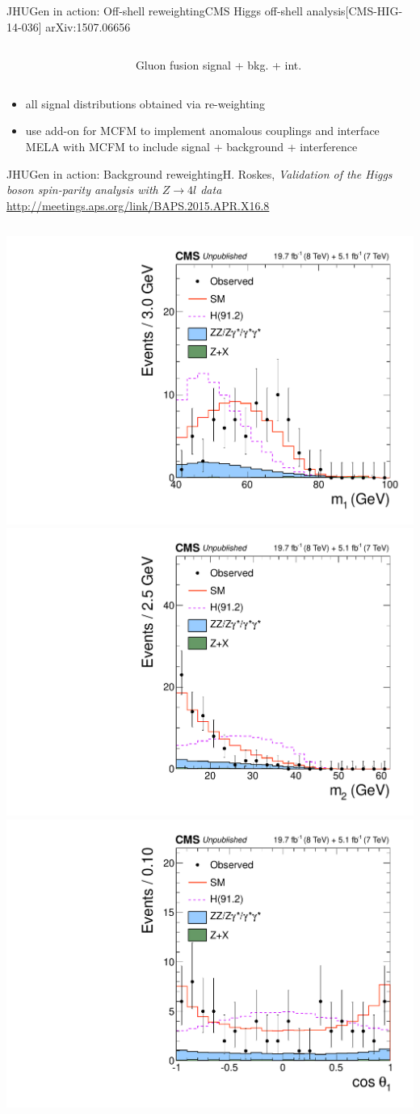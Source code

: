 \documentclass[usenames,dvipsnames,svgnames,table]{beamer}
\begin{document}
\begin{frame}{JHUGen in action: Off-shell reweighting}{CMS Higgs off-shell analysis\hfill [CMS-HIG-14-036] arXiv:1507.06656}
\begin{columns}
\begin{column}{0.75\textwidth}
\end{column}
\begin{column}{0.15\textwidth}
Gluon fusion signal + bkg. + int.
\end{column}
\end{columns}
\begin{itemize} \footnotesize
\item all signal distributions obtained via re-weighting
\item use add-on for MCFM to implement anomalous couplings and interface MELA with MCFM to include signal + background + interference
\end{itemize}
\end{frame}

\begin{frame}{JHUGen in action: Background reweighting}{H. Roskes, \emph{Validation of the Higgs boson spin-parity
analysis with $Z\to 4l$ data}\\ \url{http://meetings.aps.org/link/BAPS.2015.APR.X16.8}}
\begin{columns}
\begin{column}{0.55\textwidth}
\includegraphics[width=.5\columnwidth]{reweighting/HVV/Z4lm1}
\includegraphics[width=.5\columnwidth]{reweighting/HVV/Z4lm2} \\
\includegraphics[width=.5\columnwidth]{reweighting/HVV/Z4lcostheta1}

\end{column}
\end{columns}
\end{frame}
\end{document}
